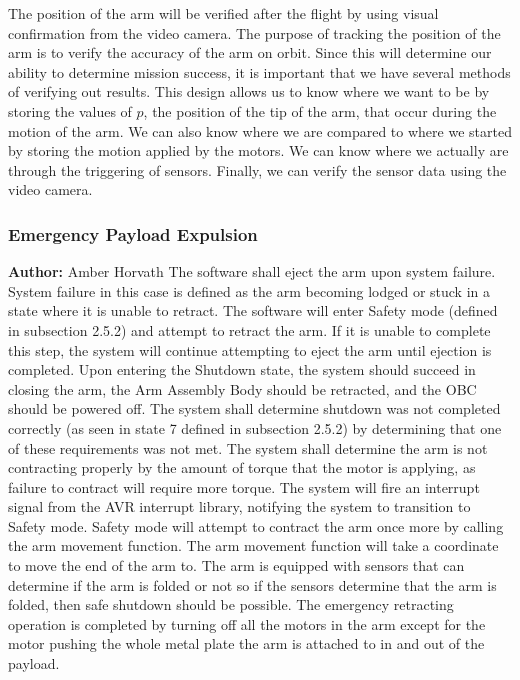 The position of the arm will be verified after the flight by using visual confirmation from the video 
camera. The purpose of tracking the position of the arm is to verify the accuracy of the arm on orbit. 
Since this will determine our ability to determine mission success, it is important that we have several 
methods of verifying out results. This design allows us to know where we want to be by storing the values
 of \(p\), the position of the tip of the arm, that occur during the motion of the arm. We can also know 
where we are compared to where we started by storing the motion applied by the motors. We can know where 
we actually are through the triggering of sensors. Finally, we can verify the sensor data using the video
 camera.

\subsubsection{Emergency Payload Expulsion}
\textbf{Author:} Amber Horvath
The software shall eject the arm upon system failure. 
System failure in this case is defined as the arm becoming lodged or stuck in a state where it is unable to retract.
The software will enter Safety mode (defined in subsection 2.5.2) and attempt to retract the arm. If it is unable to complete this step,
 the system will continue attempting to eject the arm until ejection is completed.
Upon entering the Shutdown state, the system should succeed in closing the arm, the Arm Assembly Body should be retracted, 
and the \gls{OBC} should be powered off. 
The system shall determine shutdown was not completed correctly (as seen in state 7 defined in subsection 2.5.2) by determining that one 
of these requirements was not met.
The system shall determine the arm is not contracting properly by the amount of torque that the motor is applying, as failure to 
contract will require more torque. The system will fire an interrupt signal from the AVR interrupt library, notifying the system to 
transition to Safety mode. 
Safety mode will attempt to contract the arm once more by calling the arm movement function. The arm movement function will take a 
coordinate to move the end of the arm to. The arm is equipped with sensors that can determine if the arm is folded or not
so if the sensors determine that the arm is folded, then safe shutdown should be possible.
The emergency retracting operation is completed by turning off all the motors in the 
 arm except for the motor pushing the whole metal plate the arm is attached to in and out of the payload.
